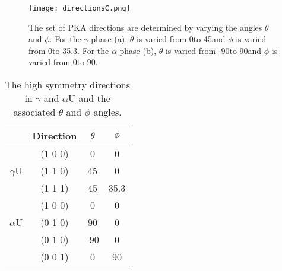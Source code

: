 \documentclass[review]{elsarticle}
\begin{document}
\begin{figure}[h]
 \centering
 \texttt{[image: directionsC.png]} 
 \caption{The set of PKA directions are determined by varying the angles $\theta$ and $\phi$. For the $\gamma$ phase (a), $\theta$ is varied from 0\degree to 45\degree and $\phi$ is varied from 0\degree to 35.3\degree. For the $\alpha$ phase (b), $\theta$ is varied from -90\degree to 90\degree and $\phi$ is varied from 0\degree to 90\degree.}
 \label{fig:directions}
\end{figure}

\begin{table}[h]
\caption{The high symmetry directions in $\gamma$ and $\alpha$U and the associated $\theta$ and $\phi$ angles.} \label{tab:dirs}
\begin{center}
\begin{tabular}{|c|c|c|c|}
	\hline
	& Direction & $\theta$ & $\phi$ \\
	 \hline
	 & (1 0 0) & 0 & 0 \\
	$\gamma$U & (1 1 0) & 45 & 0 \\
	& (1 1 1) & 45 & 35.3 \\
	 \hline
	 	 & (1 0 0) & 0 & 0 \\
	$\alpha$U & (0 1 0) & 90 & 0 \\
	& (0 $\bar{1}$ 0) & -90 & 0 \\
	& (0 0 1) & 0 & 90 \\
	 \hline
\end{tabular}
\end{center}
\label{default}
\end{table}


\FloatBarrier
\end{document}
